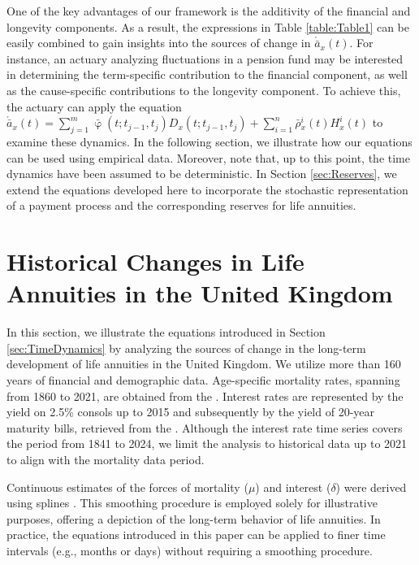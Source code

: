 \documentclass[12pt]{article}
\begin{document}
{One of the key advantages of our framework is the additivity of the financial and longevity components. As a result, the expressions in Table \ref{table:Table1} can be easily combined to gain insights into the sources of change in $\acute{\bar{a}}_x(t)$. For instance, an actuary analyzing fluctuations in a pension fund may be interested in determining the term-specific contribution to the financial component, as well as the cause-specific contributions to the longevity component. To achieve this, the actuary can apply the equation 
$\acute{\bar{a}}_x(t)=\sum_{j=1}^m\bar{\upvarphi}(t;t_{j-1},t_{j}){D}_x(t;t_{j-1},t_{j})+\sum_{i=1}^{n} \bar{\rho}{^i_x}(t){H}^{i}_x(t)$ to examine these dynamics. In the following section, we illustrate how our equations can be used using empirical data. Moreover, note that, up to this point, the time dynamics have been assumed to be deterministic. In Section \ref{sec:Reserves}, we extend the equations developed here to incorporate the stochastic representation of a payment process and the corresponding reserves for life annuities. 



\section{Historical Changes in Life Annuities in the United Kingdom}\label{sec:UK_Illustration}

In this section, we illustrate the equations introduced in Section \ref{sec:TimeDynamics} by analyzing the sources of change in the long-term development of life annuities in the United Kingdom. We utilize more than 160 years of financial and demographic data. Age-specific mortality rates, spanning from 1860 to 2021, are obtained from the \citet{HMD2024}. Interest rates are represented by the yield on 2.5\% consols up to 2015 and subsequently by the yield of 20-year maturity bills, retrieved from the \citet{BankOfEngland2024}. Although the interest rate time series covers the period from 1841 to 2024, we limit the analysis to historical data up to 2021 to align with the mortality data period.

Continuous estimates of the forces of mortality (\(\mu\)) and interest (\(\delta\)) were derived using splines \citep{green1993nonparametric,camarda2012mortalitysmooth}. This smoothing procedure is employed solely for illustrative purposes, offering a depiction of the long-term behavior of life annuities. In practice, the equations introduced in this paper can be applied to finer time intervals (e.g., months or days) without requiring a smoothing procedure.


}
\end{document}
